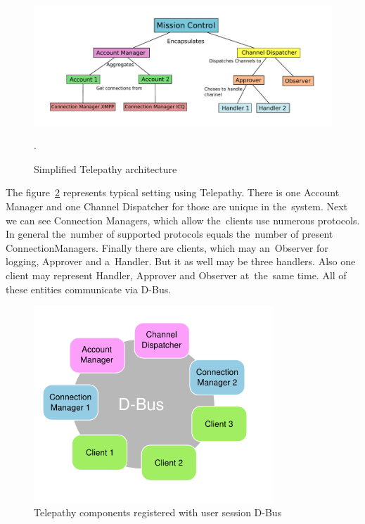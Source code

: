 \begin{figure}[ht]
	\begin{center}
	\includegraphics[width=15cm]{fig/telepathy-architecture.pdf}
	\caption{Simplified Telepathy architecture}.
	\label{fig:telepathy-architecture}
\end{center}
\end{figure}

The figure~\ref{fig:telepathyComponentsDbus} represents typical setting using Telepathy. There is one Account Manager and one Channel Dispatcher for those are unique in the~system. Next we can see Connection Managers, which allow the~clients use numerous protocols. In general the~number of supported protocols equals the~number of present ConnectionManagers. Finally there are clients, which may an~Observer for logging, Approver and a~Handler. But it as well may be three handlers. Also one client may represent Handler, Approver and Observer at~the~same time. All of these entities communicate via D-Bus.  

\begin{figure}[ht]
	\begin{center}
	\includegraphics[width=9cm]{fig/telepathy-components-dbus.png}
	\caption{Telepathy components registered with user session D-Bus~\cite{TPWiki}}
	\label{fig:telepathyComponentsDbus}
\end{center}
\end{figure}


